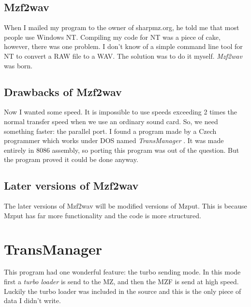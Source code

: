 \subsection{Mzf2wav}
When I mailed my program to the owner of sharpmz.org, he told me that most
people use Windows NT. Compiling my code for NT was a piece of cake, however,
there was one problem. I don't know of a simple command line tool for NT to
convert a RAW file to a WAV. The solution was to do it myself. \emph{Mzf2wav}
\cite{M2W} was born.

\subsection{Drawbacks of Mzf2wav}
Now I wanted some speed. It is impossible to use speeds exceeding 2 times the
normal transfer speed when we use an ordinary sound card. So, we need something
faster: the parallel port. I found a program made by a Czech programmer which
works under DOS named \emph{TransManager} \cite{TM}. It was made entirely in 
8086 assembly, so porting this program was out of the question. But the program 
proved it could be done anyway.

\subsection{Later versions of Mzf2wav}
The later versions of Mzf2wav will be modified versions of Mzput. This is
because Mzput has far more functionality and the code is more structured. 

\section{TransManager}
This program had one wonderful feature: the turbo sending mode. In this mode 
first a \emph{turbo loader} \cite{TM} is send to the MZ, and then the MZF is 
send at high speed.
Luckily the turbo loader was included in the source and this is the only piece 
of data I didn't write.

